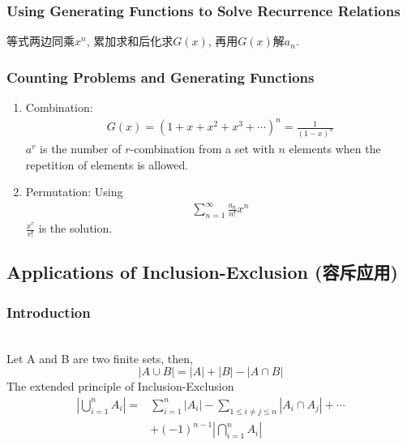 \subsubsection{Using Generating Functions to Solve Recurrence Relations}
等式两边同乘$x^n$, 累加求和后化求$G(x)$, 再用$G(x)$解$a_n$.

\subsubsection{Counting Problems and Generating Functions}
\begin{enumerate}
    \item Combination: 
    \begin{align*}
        G(x)=(1+x+x^2+x^3+\cdots)^n=\frac{1}{(1-x)^n}
    \end{align*}
    $a^r$ is the number of $r$-combination from a set with $n$ elements when the repetition of elements is allowed. 
    \item Permutation: Using
    \begin{align*}
        \sum_{n=1}^{\infty}\frac{a_n}{n!}x^n
    \end{align*}
    $\frac{x^r}{r!}$ is the solution. 
\end{enumerate}

\subsection[Applications of Inclusion-Exclusion]{Applications of Inclusion-Exclusion (容斥应用)}
\subsubsection{Introduction}
\begin{theorem}\quad \\
    Let A and B are two finite sets, then,
    \[ |A\cup B|=|A|+|B|-|A\cap B| \]
    The extended principle of Inclusion-Exclusion
    \begin{align*}
        \left| \bigcup_{i=1}^n A_i \right|=&\sum_{i=1}^n\left| A_i \right|-\sum_{1\le i\ne j\le n} \left| A_i\cap A_j \right| + \cdots \\
        &+(-1)^{n-1}\left| \bigcap_{i=1}^n A_i \right|
    \end{align*}
\end{theorem}